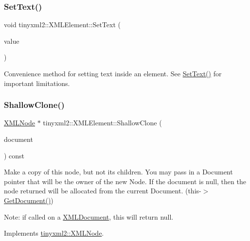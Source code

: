 \subsubsection{\texorpdfstring{Set\+Text()}{SetText()}\hspace{0.1cm}{\footnotesize\ttfamily [7/7]}}
{\footnotesize\ttfamily void tinyxml2\+::\+X\+M\+L\+Element\+::\+Set\+Text (\begin{DoxyParamCaption}\item[{float}]{value }\end{DoxyParamCaption})}



Convenience method for setting text inside an element. See \mbox{\hyperlink{classtinyxml2_1_1_x_m_l_element_a1f9c2cd61b72af5ae708d37b7ad283ce}{Set\+Text()}} for important limitations. 

\mbox{\label{classtinyxml2_1_1_x_m_l_element_aafa2807a45b28fe096b29d76e6a13b7c}} 
\subsubsection{\texorpdfstring{Shallow\+Clone()}{ShallowClone()}}
{\footnotesize\ttfamily \mbox{\hyperlink{classtinyxml2_1_1_x_m_l_node}{X\+M\+L\+Node}} $\ast$ tinyxml2\+::\+X\+M\+L\+Element\+::\+Shallow\+Clone (\begin{DoxyParamCaption}\item[{\mbox{\hyperlink{classtinyxml2_1_1_x_m_l_document}{X\+M\+L\+Document}} $\ast$}]{document }\end{DoxyParamCaption}) const\hspace{0.3cm}{\ttfamily [virtual]}}

Make a copy of this node, but not its children. You may pass in a Document pointer that will be the owner of the new Node. If the \textquotesingle{}document\textquotesingle{} is null, then the node returned will be allocated from the current Document. (this-\/$>$\mbox{\hyperlink{classtinyxml2_1_1_x_m_l_node_af343d1ef0b45c0020e62d784d7e67a68}{Get\+Document()}})

Note\+: if called on a \mbox{\hyperlink{classtinyxml2_1_1_x_m_l_document}{X\+M\+L\+Document}}, this will return null. 

Implements \mbox{\hyperlink{classtinyxml2_1_1_x_m_l_node_a8402cbd3129d20e9e6024bbcc0531283}{tinyxml2\+::\+X\+M\+L\+Node}}.

